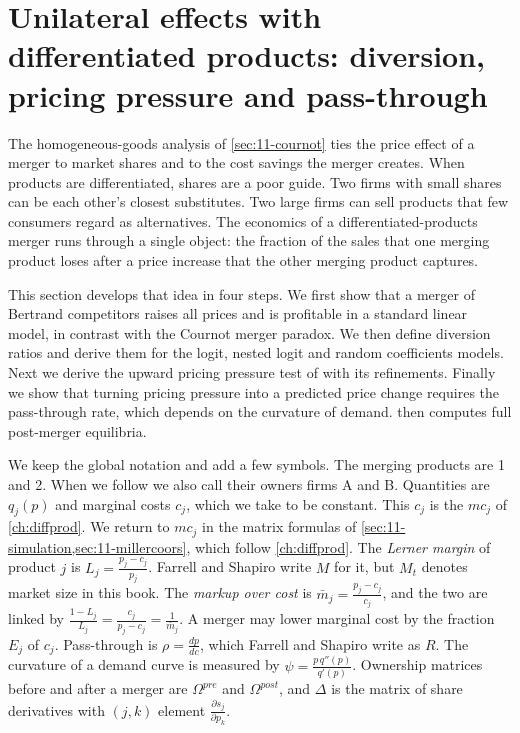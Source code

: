 \section{Unilateral effects with differentiated products: diversion, pricing pressure and pass-through}\label{sec:11-upp}

The homogeneous-goods analysis of \cref{sec:11-cournot} ties the price effect of a merger to market shares and to
the cost savings the merger creates. When products are differentiated, shares are a poor guide. Two firms with
small shares can be each other's closest substitutes. Two large firms can sell products that few consumers regard
as alternatives. The economics of a differentiated-products merger runs through a single object: the fraction of
the sales that one merging product loses after a price increase that the other merging product captures.

This section develops that idea in four steps. We first show that a merger of Bertrand competitors raises all
prices and is profitable in a standard linear model, in contrast with the Cournot merger paradox. We then define
diversion ratios and derive them for the logit, nested logit and random coefficients models. Next we derive the
upward pricing pressure test of \citet{FarrellShapiro2010} with its refinements. Finally we show that turning
pricing pressure into a predicted price change requires the pass-through rate, which depends on the curvature of
demand.  then computes full post-merger equilibria.

We keep the global notation and add a few symbols. The merging products are 1 and 2. When we follow
\citet{FarrellShapiro2010} we also call their owners firms A and B. Quantities are $q_j(p)$ and marginal costs
$c_j$, which we take to be constant. This $c_j$ is the $mc_j$ of \cref{ch:diffprod}. We return to $mc_j$ in the
matrix formulas of \cref{sec:11-simulation,sec:11-millercoors}, which follow \cref{ch:diffprod}. The \emph{Lerner margin} of product $j$ is $L_j = \frac{p_j - c_j}{p_j}$.
Farrell and Shapiro write $M$ for it, but $M_t$ denotes market size in this book. The \emph{markup over cost} is
$\bar m_j = \frac{p_j - c_j}{c_j}$, and the two are linked by $\frac{1 - L_j}{L_j} = \frac{c_j}{p_j - c_j} =
\frac{1}{\bar m_j}$. A merger may lower marginal cost by the fraction $E_j$ of $c_j$. Pass-through is
$\rho = \frac{dp}{dc}$, which Farrell and Shapiro write as $R$. The curvature of a demand curve is measured by
$\psi = \frac{p\,q''(p)}{q'(p)}$. Ownership matrices before and after a merger are $\Omega^{pre}$ and
$\Omega^{post}$, and $\Delta$ is the matrix of share derivatives with $(j,k)$ element
$\frac{\partial s_j}{\partial p_k}$.

